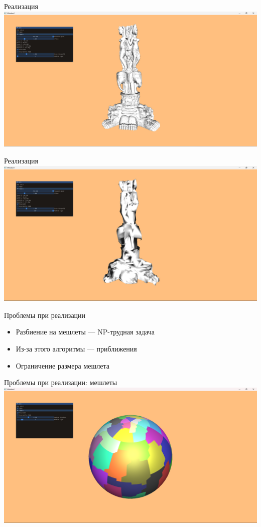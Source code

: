 \documentclass{beamer}
\begin{document}
    \begin{frame}{Реализация}
        \includegraphics[width=\textwidth]{demo-1.png}
    \end{frame}

    \begin{frame}{Реализация}
        \includegraphics[width=\textwidth]{demo-2.png}
    \end{frame}

    \begin{frame}{Проблемы при реализации}
        \begin{itemize}
            \item Разбиение на мешлеты --- NP-трудная задача
            \item Из-за этого алгоритмы --- приближения
            \item Ограничение размера мешлета
        \end{itemize}
    \end{frame}

    \begin{frame}{Проблемы при реализации: мешлеты}
        \includegraphics[width=\textwidth]{sphere0.png}
    \end{frame}
\end{document}
